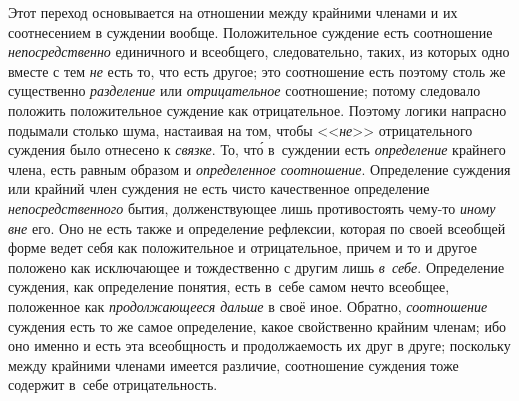 Этот переход основывается на отношении между крайними членами и их соотнесением
в суждении вообще. Положительное суждение есть соотношение
{\em непосредственно} единичного и всеобщего, следовательно, таких, из которых
одно вместе с тем {\em не} есть то, что есть другое; это соотношение есть
поэтому столь же существенно {\em разделение} или {\em отрицательное}
соотношение; потому следовало положить положительное суждение как отрицательное.
Поэтому логики напрасно подымали столько шума, настаивая на том, чтобы
<<{\em не}>> отрицательного суждения было отнесено к {\em связке}. То, чт\'{о}
в~суждении есть {\em определение} крайнего члена, есть равным образом
и {\em определенное соотношение}. Определение суждения или крайний член
суждения не есть чисто качественное определение {\em непосредственного} бытия,
долженствующее лишь противостоять чему-то {\em иному вне} его. Оно не есть
также и определение рефлексии, которая по своей всеобщей форме ведет себя как
положительное и отрицательное, причем и то и другое положено как исключающее и
тождественно с другим лишь {\em в~себе}. Определение суждения, как определение
понятия, есть в~себе самом нечто всеобщее, положенное как {\em продолжающееся
дальше} в своё иное. Обратно, {\em соотношение} суждения есть то же самое
определение, какое свойственно крайним членам; ибо оно именно и есть эта
всеобщность и продолжаемость их друг в друге; поскольку между крайними членами
имеется различие, соотношение суждения тоже содержит в~себе отрицательность.

